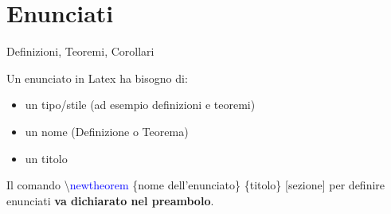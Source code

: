 \section{Enunciati}
  \begin{frame}{Definizioni, Teoremi, Corollari}

	Un enunciato in Latex ha bisogno di:

    \begin{itemize}
      \item un tipo/stile (ad esempio definizioni e teoremi)
      \item un nome (Definizione o Teorema)
	  \item un titolo
    \end{itemize}

	Il comando \textbackslash \textcolor{blue}{newtheorem} \{nome dell'enunciato\} \{titolo\} [sezione] per definire enunciati \textbf{va dichiarato nel preambolo}.

\end{frame}
